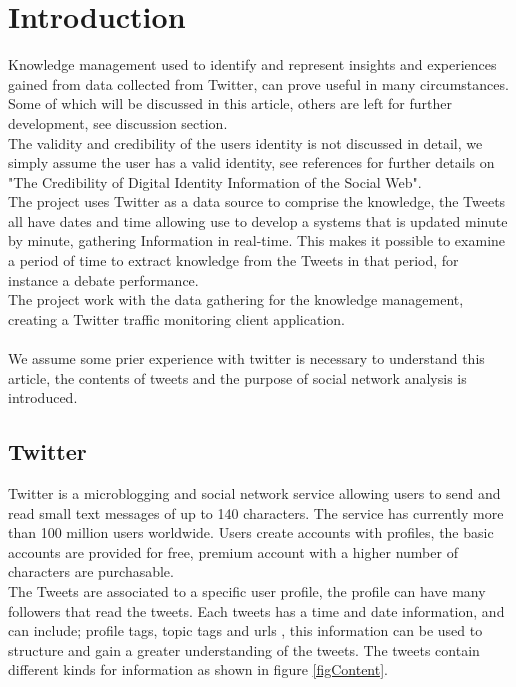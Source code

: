 \documentclass[]{article}  %
\begin{document}
\section{Introduction}
Knowledge management used to identify and represent insights and experiences gained from data collected from Twitter, can prove useful in many circumstances. Some of which will be discussed in this article, others are left for further development, see discussion section. \\ The validity and credibility of the users identity is not discussed  in detail, we simply assume the user has a valid identity, see references for further details on "The Credibility of Digital Identity Information of the Social Web". \\ The project uses Twitter as a data source to comprise the knowledge, the Tweets all have dates and time allowing use to develop a systems that is updated minute by minute, gathering Information in real-time. This makes it possible to examine a period of time to extract knowledge from the Tweets in that period, for instance a debate performance\cite{bib10}.\\  The project work with the data gathering for the knowledge management, creating a Twitter traffic monitoring client application. \\ \\ We assume some prier experience with twitter is necessary to understand this article, the contents of tweets and the purpose of social network analysis is introduced.

	
\subsection{Twitter}
Twitter is a microblogging and social network service allowing users to send and read small text messages of up to 140 characters. The service has currently more than 100 million users worldwide. Users create accounts with profiles, the basic accounts are provided for free, premium account with a higher number of characters are purchasable. \\ The Tweets are associated to a specific user profile, the profile can have many followers that read the tweets. Each tweets has a time and date information, and can include; profile tags, topic tags and urls , this information can be used to structure and gain a greater understanding of the tweets. \newpage  The tweets contain different kinds for information as shown in figure \ref{figContent}. 
\end{document}
